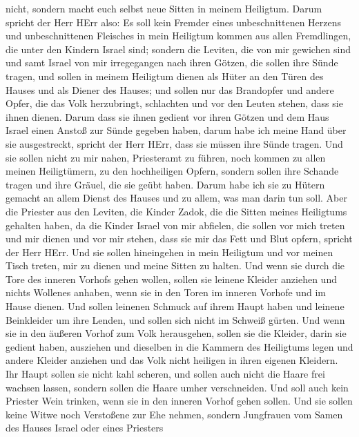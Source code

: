 nicht, sondern macht euch selbst neue Sitten in meinem Heiligtum.
 Darum spricht der Herr HErr also: Es soll kein Fremder
eines unbeschnittenen Herzens und unbeschnittenen Fleisches in mein
Heiligtum kommen aus allen Fremdlingen, die unter den Kindern Israel
sind;  sondern die Leviten, die von mir gewichen sind und
samt Israel von mir irregegangen nach ihren Götzen, die sollen ihre
Sünde tragen,  und sollen in meinem Heiligtum dienen als
Hüter an den Türen des Hauses und als Diener des Hauses; und sollen nur
das Brandopfer und andere Opfer, die das Volk herzubringt, schlachten
und vor den Leuten stehen, dass sie ihnen dienen.  Darum
dass sie ihnen gedient vor ihren Götzen und dem Haus Israel einen Anstoß
zur Sünde gegeben haben, darum habe ich meine Hand über sie
ausgestreckt, spricht der Herr HErr, dass sie müssen ihre Sünde tragen.
 Und sie sollen nicht zu mir nahen, Priesteramt zu führen,
noch kommen zu allen meinen Heiligtümern, zu den hochheiligen Opfern,
sondern sollen ihre Schande tragen und ihre Gräuel, die sie geübt haben.
 Darum habe ich sie zu Hütern gemacht an allem Dienst des
Hauses und zu allem, was man darin tun soll.  Aber die
Priester aus den Leviten, die Kinder Zadok, die die Sitten meines
Heiligtums gehalten haben, da die Kinder Israel von mir abfielen, die
sollen vor mich treten und mir dienen und vor mir stehen, dass sie mir
das Fett und Blut opfern, spricht der Herr HErr.  Und sie
sollen hineingehen in mein Heiligtum und vor meinen Tisch treten, mir zu
dienen und meine Sitten zu halten.  Und wenn sie durch die
Tore des inneren Vorhofs gehen wollen, sollen sie leinene Kleider
anziehen und nichts Wollenes anhaben, wenn sie in den Toren im inneren
Vorhofe und im Hause dienen.  Und sollen leinenen Schmuck
auf ihrem Haupt haben und leinene Beinkleider um ihre Lenden, und sollen
sich nicht im Schweiß gürten.  Und wenn sie in den äußeren
Vorhof zum Volk herausgehen, sollen sie die Kleider, darin sie gedient
haben, ausziehen und dieselben in die Kammern des Heiligtums legen und
andere Kleider anziehen und das Volk nicht heiligen in ihren eigenen
Kleidern.  Ihr Haupt sollen sie nicht kahl scheren, und
sollen auch nicht die Haare frei wachsen lassen, sondern sollen die
Haare umher verschneiden.  Und soll auch kein Priester Wein
trinken, wenn sie in den inneren Vorhof gehen sollen.  Und
sie sollen keine Witwe noch Verstoßene zur Ehe nehmen, sondern
Jungfrauen vom Samen des Hauses Israel oder eines Priesters

